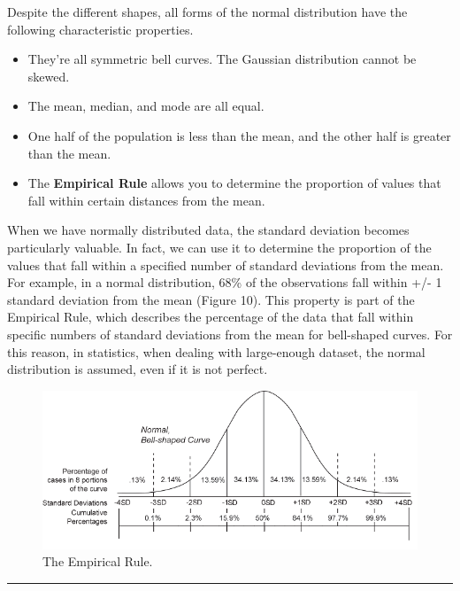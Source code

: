 \documentclass[
]{svmono}
\begin{document}
Despite the different shapes, all forms of the normal distribution have
the following characteristic properties.

\begin{itemize}
\item
  They're all symmetric bell curves. The Gaussian distribution cannot
  be skewed.
\item
  The mean, median, and mode are all equal.
\item
  One half of the population is less than the mean, and the other half
  is greater than the mean.
\item
  The \textbf{Empirical Rule} allows you to determine the proportion of
  values that fall within certain distances from the mean.
\end{itemize}

When we have normally distributed data, the standard deviation becomes
particularly valuable. In fact, we can use it to determine the
proportion of the values that fall within a specified number of standard
deviations from the mean. For example, in a normal distribution, 68\% of
the observations fall within +/- 1 standard deviation from the mean
(Figure 10). This property is part of the Empirical Rule, which
describes the percentage of the data that fall within specific numbers
of standard deviations from the mean for bell-shaped curves. For this
reason, in statistics, when dealing with large-enough dataset, the
normal distribution is assumed, even if it is not perfect.

\begin{figure}[H]

{\centering \includegraphics[width=0.8\linewidth,]{images/Senza titolo} 

}

\caption{The Empirical Rule.}\label{fig:unnamed-chunk-56}
\end{figure}

\begin{center}\rule{0.5\linewidth}{0.5pt}\end{center}
\end{document}
